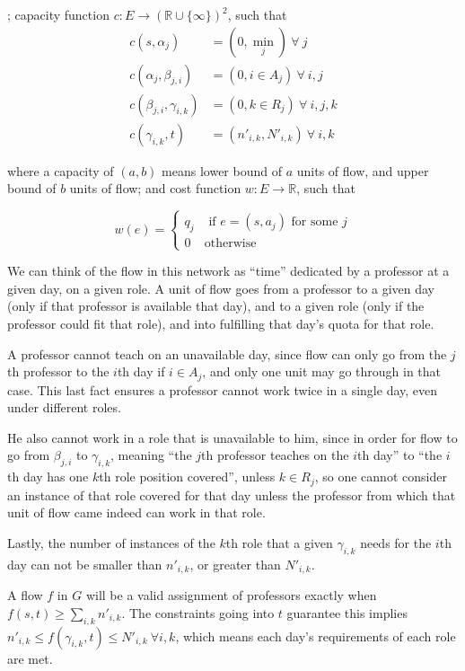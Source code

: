 ; capacity function $c:E \to \left(\mathbb{R} \cup \{\infty\}\right)^2$, such that
\begin{align*}
  c(s, \alpha_j) &= (0, \textstyle\min_j)\ \forall\ j\\
  c(\alpha_j, \beta_{j, i}) &= (0, i \in A_j)\ \forall\ i, j\\
  c(\beta_{j, i}, \gamma_{i, k}) &= (0, k \in R_j)\ \forall\ i, j, k\\
  c(\gamma_{i, k}, t) &= (n'_{i, k}, N'_{i, k})\ \forall\ i, k
\end{align*}

where a capacity of $(a, b)$ means lower bound of $a$ units of flow, and upper bound of $b$ units of flow; and cost function $w:E \to \mathbb{R}$, such that

$$
w(e) =
\begin{cases}
q_j &\text{ if } e = (s, a_j) \text{ for some }j\\
0 & \text{otherwise}
\end{cases}
$$

We can think of the flow in this network as ``time'' dedicated by a professor at a given day, on a given role. A unit of flow goes from a professor to a given day (only if that professor is available that day), and to a given role (only if the professor could fit that role), and into fulfilling that day's quota for that role.

A professor cannot teach on an unavailable day, since flow can only go from the $j$th professor to the $i$th day if $i \in A_j$, and only one unit may go through in that case. This last fact ensures a professor cannot work twice in a single day, even under different roles.

He also cannot work in a role that is unavailable to him, since in order for flow to go from $\beta_{j, i}$ to $\gamma_{i, k}$, meaning ``the $j$th professor teaches on the $i$th day'' to ``the $i$th day has one $k$th role position covered'', unless $k \in R_j$, so one cannot consider an instance of that role covered for that day unless the professor from which that unit of flow came indeed can work in that role.

Lastly, the number of instances of the $k$th role that a given $\gamma_{i, k}$ needs for the $i$th day can not be smaller than $n'_{i, k}$, or greater than $N'_{i, k}$.

A flow $f$ in $G$ will be a valid assignment of professors exactly when $f(s, t) \ge \sum_{i, k} n'_{i, k}$. The constraints going into $t$ guarantee this implies $n'_{i, k} \le f(\gamma_{i, k}, t) \le N'_{i, k}\ \forall i, k$, which means each day's requirements of each role are met.

